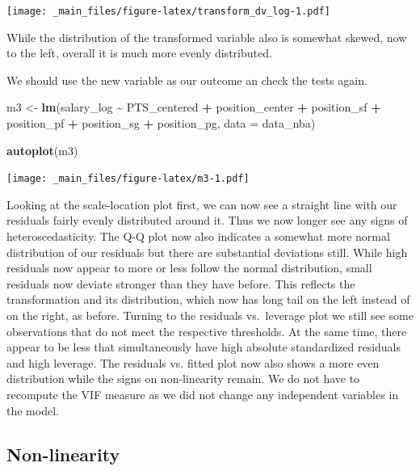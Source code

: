 \documentclass[
]{book}
\newenvironment{Shaded}{\begin{snugshade}}{\end{snugshade}}
\newcommand{\AttributeTok}[1]{\textcolor[rgb]{0.13,0.29,0.53}{#1}}
\newcommand{\FunctionTok}[1]{\textcolor[rgb]{0.13,0.29,0.53}{\textbf{#1}}}
\newcommand{\NormalTok}[1]{#1}
\newcommand{\OtherTok}[1]{\textcolor[rgb]{0.56,0.35,0.01}{#1}}
\newcommand{\SpecialCharTok}[1]{\textcolor[rgb]{0.81,0.36,0.00}{\textbf{#1}}}
\begin{document}
\texttt{[image: \_main\_files/figure-latex/transform\_dv\_log-1.pdf]}

While the distribution of the transformed variable also is somewhat
skewed, now to the left, overall it is much more evenly distributed.

We should use the new variable as our outcome an check the tests again.

\begin{Shaded}
\begin{Highlighting}[]
\NormalTok{m3 }\OtherTok{\textless{}{-}} \FunctionTok{lm}\NormalTok{(salary\_log }\SpecialCharTok{\textasciitilde{}}\NormalTok{ PTS\_centered }\SpecialCharTok{+}\NormalTok{ position\_center }\SpecialCharTok{+}\NormalTok{ position\_sf }\SpecialCharTok{+}\NormalTok{  position\_pf }\SpecialCharTok{+}\NormalTok{ position\_sg }\SpecialCharTok{+}\NormalTok{ position\_pg, }\AttributeTok{data =}\NormalTok{ data\_nba)}

\FunctionTok{autoplot}\NormalTok{(m3)}
\end{Highlighting}
\end{Shaded}

\texttt{[image: \_main\_files/figure-latex/m3-1.pdf]}

Looking at the scale-location plot first, we can now see a straight line
with our residuals fairly evenly distributed around it. Thus we now
longer see any signs of heteroscedasticity. The Q-Q plot now also
indicates a somewhat more normal distribution of our residuals but there
are substantial deviations still. While high residuals now appear to
more or less follow the normal distribution, small residuals now deviate
stronger than they have before. This reflects the transformation and its
distribution, which now has long tail on the left instead of on the
right, as before. Turning to the residuals vs.~leverage plot we still
see some observations that do not meet the respective thresholds. At the
same time, there appear to be less that simultaneously have high
absolute standardized residuals and high leverage. The residuals vs.
fitted plot now also shows a more even distribution while the signs on
non-linearity remain. We do not have to recompute the VIF measure as we
did not change any independent variables in the model.

\hypertarget{non-linearity}{%
\subsection{Non-linearity}\label{non-linearity}}
\end{document}
